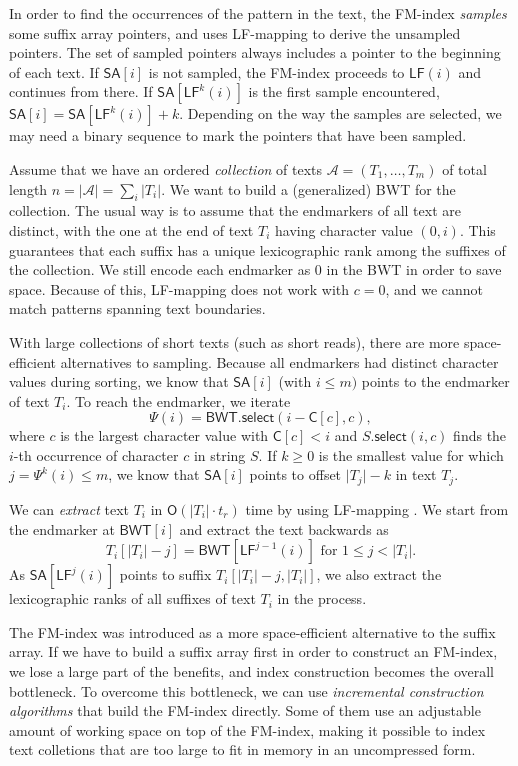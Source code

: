 \documentclass[smallabstract,smallcaptions]{dccpaper}
\newcommand{\abs}[1]{\ensuremath{\lvert #1 \rvert}}
\newcommand{\Oh}{\ensuremath{\mathsf{O}}}
\newcommand{\BWT}{\textsf{BWT}}
\newcommand{\mSA}{\ensuremath{\mathsf{SA}}}
\newcommand{\mBWT}{\ensuremath{\mathsf{BWT}}}
\newcommand{\mC}{\ensuremath{\mathsf{C}}}
\newcommand{\LF}{\textsf{LF}}
\newcommand{\mLF}{\ensuremath{\mathsf{LF}}}
\newcommand{\mselect}{\ensuremath{\mathsf{select}}}
\newcommand{\Acoll}{\ensuremath{\mathcal{A}}}
\begin{document}
In order to find the occurrences of the pattern in the text, the FM-index \emph{samples} some suffix array pointers, and uses \LF\nobreakdash-mapping to derive the unsampled pointers. The set of sampled pointers always includes a pointer to the beginning of each text. If $\mSA[i]$ is not sampled, the FM-index proceeds to $\mLF(i)$ and continues from there. If $\mSA[\mLF^{k}(i)]$ is the first sample encountered, $\mSA[i] = \mSA[\mLF^{k}(i)] + k$. Depending on the way the samples are selected, we may need a binary sequence to mark the pointers that have been sampled.

Assume that we have an ordered \emph{collection} of texts $\Acoll = (T_{1}, \dotsc, T_{m})$ of total length $n = \abs{\Acoll} = \sum_{i} \abs{T_{i}}$. We want to build a (generalized) \BWT{} for the collection. The usual way is to assume that the endmarkers of all text are distinct, with the one at the end of text $T_{i}$ having character value $(0,i)$. This guarantees that each suffix has a unique lexicographic rank among the suffixes of the collection. We still encode each endmarker as $0$ in the \BWT{} in order to save space. Because of this, \LF\nobreakdash-mapping does not work with $c = 0$, and we cannot match patterns spanning text boundaries.

With large collections of short texts (such as short reads), there are more space-efficient alternatives to sampling. Because all endmarkers had distinct character values during sorting, we know that $\mSA[i]$ (with $i \le m)$ points to the endmarker of text $T_{i}$. To reach the endmarker, we iterate
$$
\Psi(i) = \mBWT.\mselect(i - \mC[c], c),
$$
where $c$ is the largest character value with $\mC[c] < i$ and $S.\mselect(i,c)$ finds the $i$\nobreakdash-th occurrence of character $c$ in string $S$. If $k \ge 0$ is the smallest value for which $j = \Psi^{k}(i) \le m$, we know that $\mSA[i]$ points to offset $\abs{T_{j}} - k$ in text $T_{j}$.

We can \emph{extract} text $T_{i}$ in $\Oh(\abs{T_{i}} \cdot t_{r})$ time by using \LF\nobreakdash-mapping \cite{Burrows1994}. We start from the endmarker at $\mBWT[i]$ and extract the text backwards as
$$
T_{i}[\abs{T_{i}} - j] = \mBWT[\LF^{j-1}(i)] \,\, \textrm{for} \,\, 1 \le j < \abs{T_{i}}.
$$
As $\mSA[\LF^{j}(i)]$ points to suffix $T_{i}[\abs{T_{i}}-j, \abs{T_{i}}]$, we also extract the lexicographic ranks of all suffixes of text $T_{i}$ in the process.


\Section{Space-efficient \BWT{} construction}

The FM-index was introduced as a more space-efficient alternative to the suffix array. If we have to build a suffix array first in order to construct an FM-index, we lose a large part of the benefits, and index construction becomes the overall bottleneck. To overcome this bottleneck, we can use \emph{incremental construction algorithms} that build the FM-index directly. Some of them use an adjustable amount of working space on top of the FM-index, making it possible to index text colletions that are too large to fit in memory in an uncompressed form.
\end{document}
